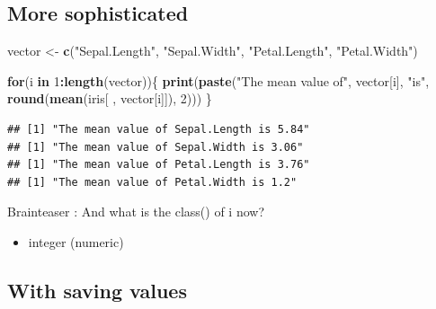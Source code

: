 \documentclass[
]{book}
\newenvironment{Shaded}{\begin{snugshade}}{\end{snugshade}}
\newcommand{\ControlFlowTok}[1]{\textcolor[rgb]{0.13,0.29,0.53}{\textbf{#1}}}
\newcommand{\DecValTok}[1]{\textcolor[rgb]{0.00,0.00,0.81}{#1}}
\newcommand{\FunctionTok}[1]{\textcolor[rgb]{0.13,0.29,0.53}{\textbf{#1}}}
\newcommand{\NormalTok}[1]{#1}
\newcommand{\OtherTok}[1]{\textcolor[rgb]{0.56,0.35,0.01}{#1}}
\newcommand{\SpecialCharTok}[1]{\textcolor[rgb]{0.81,0.36,0.00}{\textbf{#1}}}
\newcommand{\StringTok}[1]{\textcolor[rgb]{0.31,0.60,0.02}{#1}}
\providecommand{\tightlist}{%
  \setlength{\itemsep}{0pt}\setlength{\parskip}{0pt}}
\begin{document}
\subsection{More sophisticated}\label{more-sophisticated}

\begin{Shaded}
\begin{Highlighting}[]
\NormalTok{vector }\OtherTok{\textless{}{-}} \FunctionTok{c}\NormalTok{(}\StringTok{"Sepal.Length"}\NormalTok{, }\StringTok{"Sepal.Width"}\NormalTok{, }\StringTok{"Petal.Length"}\NormalTok{, }\StringTok{"Petal.Width"}\NormalTok{)}

\ControlFlowTok{for}\NormalTok{(i }\ControlFlowTok{in} \DecValTok{1}\SpecialCharTok{:}\FunctionTok{length}\NormalTok{(vector))\{}
  \FunctionTok{print}\NormalTok{(}\FunctionTok{paste}\NormalTok{(}\StringTok{"The mean value of"}\NormalTok{, vector[i], }\StringTok{"is"}\NormalTok{, }
              \FunctionTok{round}\NormalTok{(}\FunctionTok{mean}\NormalTok{(iris[ , vector[i]]), }\DecValTok{2}\NormalTok{)))}
\NormalTok{\}}
\end{Highlighting}
\end{Shaded}

\begin{verbatim}
## [1] "The mean value of Sepal.Length is 5.84"
## [1] "The mean value of Sepal.Width is 3.06"
## [1] "The mean value of Petal.Length is 3.76"
## [1] "The mean value of Petal.Width is 1.2"
\end{verbatim}

Brainteaser : And what is the class() of i now?

\begin{itemize}
\tightlist
\item
  integer (numeric)
\end{itemize}

\subsection{With saving values}\label{with-saving-values}
\end{document}

